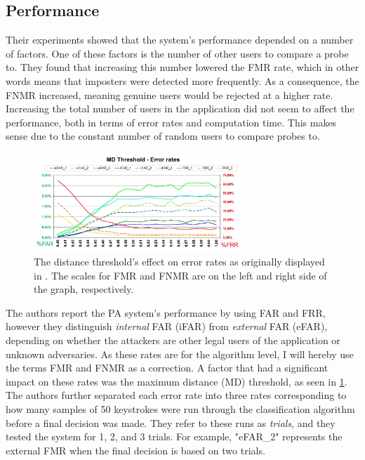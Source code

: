 \documentclass[informationsecurity]{gucmasterproject}
\begin{document}
\subsection{Performance}
Their experiments showed that the system's performance depended on a number of factors.
One of these factors is the number of other users to compare a probe to.
They found that increasing this number lowered the FMR rate, which in other words means that imposters were detected more frequently.
As a consequence, the FNMR increased, meaning genuine users would be rejected at a higher rate.
Increasing the total number of users in the application did not seem to affect the performance, both in terms of error rates and computation time.
This makes sense due to the constant number of random users to compare probes to.

\begin{figure}[h]
    \centering
    \includegraphics[width=0.7\textwidth]{messerman/messerman_thresh1}
    \caption{The distance threshold's effect on error rates as originally displayed in \cite{Messerman}. The scales for FMR and FNMR are on the left and right side of the graph, respectively.}
    \label{fig:messerman-threshold}
\end{figure}

The authors report the PA system's performance by using FAR and FRR, however they distinguish \textit{internal} FAR (iFAR) from \textit{external} FAR (eFAR), depending on whether the attackers are other legal users of the application or unknown adversaries.
As these rates are for the algorithm level, I will hereby use the terms FMR and FNMR as a correction.
A factor that had a significant impact on these rates was the maximum distance (MD) threshold, as seen in \cref{fig:messerman-threshold}.
The authors further separated each error rate into three rates corresponding to how many samples of 50 keystrokes were run through the classification algorithm before a final decision was made.
They refer to these runs as \textit{trials}, and they tested the system for 1, 2, and 3 trials.
For example, "eFAR\_2" represents the external FMR when the final decision is based on two trials. 
\end{document}
